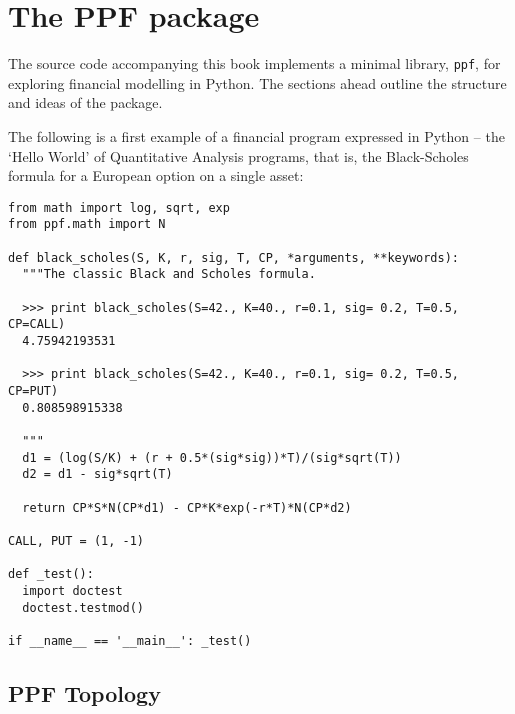 \chapter{The PPF package}\label{ch:the-ppf-package}

The source code accompanying this book implements a minimal library,
\verb|ppf|, for exploring financial modelling in Python. The sections
ahead outline the structure and ideas of the package.

The following is a first example of a financial program expressed in
Python -- the `Hello World' of Quantitative Analysis programs, that
is, the Black-Scholes formula for a European option on a single asset:

\begin{verbatim}
from math import log, sqrt, exp
from ppf.math import N

def black_scholes(S, K, r, sig, T, CP, *arguments, **keywords):
  """The classic Black and Scholes formula.

  >>> print black_scholes(S=42., K=40., r=0.1, sig= 0.2, T=0.5, CP=CALL)
  4.75942193531

  >>> print black_scholes(S=42., K=40., r=0.1, sig= 0.2, T=0.5, CP=PUT)
  0.808598915338

  """
  d1 = (log(S/K) + (r + 0.5*(sig*sig))*T)/(sig*sqrt(T))
  d2 = d1 - sig*sqrt(T)

  return CP*S*N(CP*d1) - CP*K*exp(-r*T)*N(CP*d2)

CALL, PUT = (1, -1)

def _test():
  import doctest
  doctest.testmod()

if __name__ == '__main__': _test()

\end{verbatim}

\section{PPF Topology}

